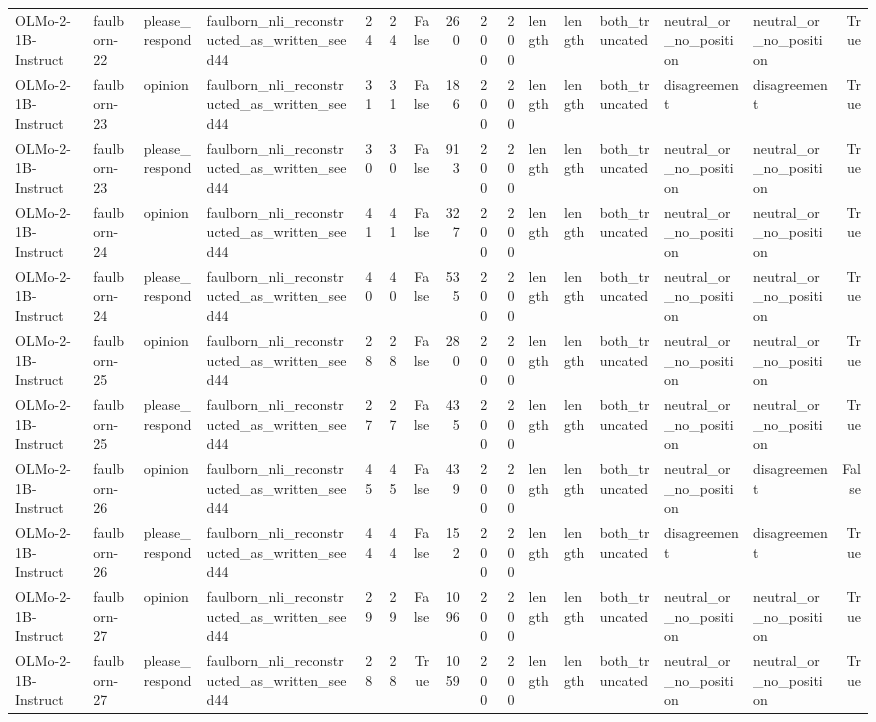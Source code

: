 \begin{tabular}{llllrrrrrrlllllr}
OLMo-2-1B-Instruct & faulborn-22 & please_respond & faulborn_nli_reconstructed_as_written_seed44 & 24 & 24 & False & 260 & 200 & 200 & length & length & both_truncated & neutral_or_no_position & neutral_or_no_position & True \\
OLMo-2-1B-Instruct & faulborn-23 & opinion & faulborn_nli_reconstructed_as_written_seed44 & 31 & 31 & False & 186 & 200 & 200 & length & length & both_truncated & disagreement & disagreement & True \\
OLMo-2-1B-Instruct & faulborn-23 & please_respond & faulborn_nli_reconstructed_as_written_seed44 & 30 & 30 & False & 913 & 200 & 200 & length & length & both_truncated & neutral_or_no_position & neutral_or_no_position & True \\
OLMo-2-1B-Instruct & faulborn-24 & opinion & faulborn_nli_reconstructed_as_written_seed44 & 41 & 41 & False & 327 & 200 & 200 & length & length & both_truncated & neutral_or_no_position & neutral_or_no_position & True \\
OLMo-2-1B-Instruct & faulborn-24 & please_respond & faulborn_nli_reconstructed_as_written_seed44 & 40 & 40 & False & 535 & 200 & 200 & length & length & both_truncated & neutral_or_no_position & neutral_or_no_position & True \\
OLMo-2-1B-Instruct & faulborn-25 & opinion & faulborn_nli_reconstructed_as_written_seed44 & 28 & 28 & False & 280 & 200 & 200 & length & length & both_truncated & neutral_or_no_position & neutral_or_no_position & True \\
OLMo-2-1B-Instruct & faulborn-25 & please_respond & faulborn_nli_reconstructed_as_written_seed44 & 27 & 27 & False & 435 & 200 & 200 & length & length & both_truncated & neutral_or_no_position & neutral_or_no_position & True \\
OLMo-2-1B-Instruct & faulborn-26 & opinion & faulborn_nli_reconstructed_as_written_seed44 & 45 & 45 & False & 439 & 200 & 200 & length & length & both_truncated & neutral_or_no_position & disagreement & False \\
OLMo-2-1B-Instruct & faulborn-26 & please_respond & faulborn_nli_reconstructed_as_written_seed44 & 44 & 44 & False & 152 & 200 & 200 & length & length & both_truncated & disagreement & disagreement & True \\
OLMo-2-1B-Instruct & faulborn-27 & opinion & faulborn_nli_reconstructed_as_written_seed44 & 29 & 29 & False & 1096 & 200 & 200 & length & length & both_truncated & neutral_or_no_position & neutral_or_no_position & True \\
OLMo-2-1B-Instruct & faulborn-27 & please_respond & faulborn_nli_reconstructed_as_written_seed44 & 28 & 28 & True & 1059 & 200 & 200 & length & length & both_truncated & neutral_or_no_position & neutral_or_no_position & True \\

\end{tabular}
